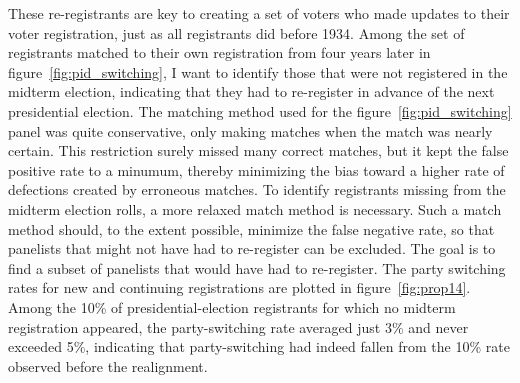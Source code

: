 \documentclass[11pt]{scrartcl}\usepackage[]{graphicx}\usepackage[]{color}
\begin{document}
These re-registrants are key to creating a set of voters who made updates to their voter registration, just as all registrants did before 1934. Among the set of registrants matched to their own registration from four years later in figure~\ref{fig:pid_switching}, I want to identify those that were not registered in the midterm election, indicating that they had to re-register in advance of the next presidential election. The matching method used for the figure~\ref{fig:pid_switching} panel was quite conservative, only making matches when the match was nearly certain. This restriction surely missed many correct matches, but it kept the false positive rate to a minumum, thereby minimizing the bias toward a higher rate of defections created by erroneous matches. To identify registrants missing from the midterm election rolls, a more relaxed match method is necessary. Such a match method should, to the extent possible, minimize the false negative rate, so that panelists that might not have had to re-register can be excluded.  The goal is to find a subset of panelists that would have had to re-register. The party switching rates for new and continuing registrations are plotted in figure~\ref{fig:prop14}. Among the 10\% of presidential-election registrants for which no midterm registration appeared, the party-switching rate averaged just 3\% and never exceeded 5\%, indicating that party-switching had indeed fallen from the 10\% rate observed before the realignment.
\end{document}
